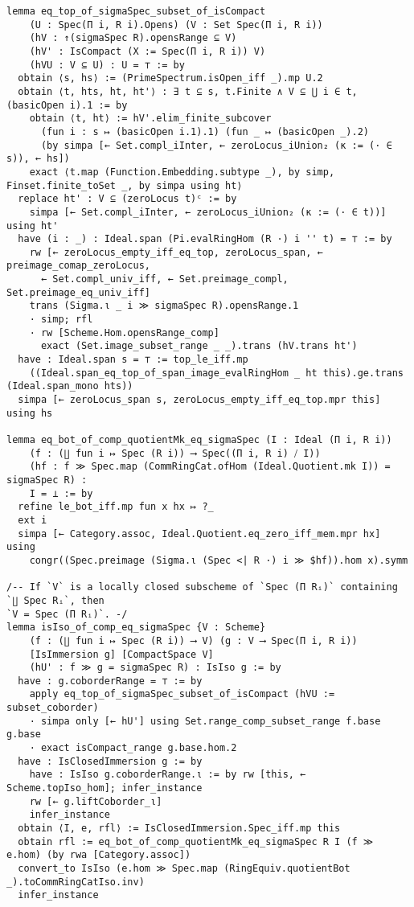 \documentclass{article}
\begin{document}
\begin{lstlisting}[language=Lean, caption={PointsPi.lean}]
lemma eq_top_of_sigmaSpec_subset_of_isCompact
    (U : Spec(Π i, R i).Opens) (V : Set Spec(Π i, R i))
    (hV : ↑(sigmaSpec R).opensRange ⊆ V)
    (hV' : IsCompact (X := Spec(Π i, R i)) V)
    (hVU : V ⊆ U) : U = ⊤ := by
  obtain ⟨s, hs⟩ := (PrimeSpectrum.isOpen_iff _).mp U.2
  obtain ⟨t, hts, ht, ht'⟩ : ∃ t ⊆ s, t.Finite ∧ V ⊆ ⋃ i ∈ t, (basicOpen i).1 := by
    obtain ⟨t, ht⟩ := hV'.elim_finite_subcover
      (fun i : s ↦ (basicOpen i.1).1) (fun _ ↦ (basicOpen _).2)
      (by simpa [← Set.compl_iInter, ← zeroLocus_iUnion₂ (κ := (· ∈ s)), ← hs])
    exact ⟨t.map (Function.Embedding.subtype _), by simp, Finset.finite_toSet _, by simpa using ht⟩
  replace ht' : V ⊆ (zeroLocus t)ᶜ := by
    simpa [← Set.compl_iInter, ← zeroLocus_iUnion₂ (κ := (· ∈ t))] using ht'
  have (i : _) : Ideal.span (Pi.evalRingHom (R ·) i '' t) = ⊤ := by
    rw [← zeroLocus_empty_iff_eq_top, zeroLocus_span, ← preimage_comap_zeroLocus,
      ← Set.compl_univ_iff, ← Set.preimage_compl, Set.preimage_eq_univ_iff]
    trans (Sigma.ι _ i ≫ sigmaSpec R).opensRange.1
    · simp; rfl
    · rw [Scheme.Hom.opensRange_comp]
      exact (Set.image_subset_range _ _).trans (hV.trans ht')
  have : Ideal.span s = ⊤ := top_le_iff.mp
    ((Ideal.span_eq_top_of_span_image_evalRingHom _ ht this).ge.trans (Ideal.span_mono hts))
  simpa [← zeroLocus_span s, zeroLocus_empty_iff_eq_top.mpr this] using hs

lemma eq_bot_of_comp_quotientMk_eq_sigmaSpec (I : Ideal (Π i, R i))
    (f : (∐ fun i ↦ Spec (R i)) ⟶ Spec((Π i, R i) ⧸ I))
    (hf : f ≫ Spec.map (CommRingCat.ofHom (Ideal.Quotient.mk I)) = sigmaSpec R) :
    I = ⊥ := by
  refine le_bot_iff.mp fun x hx ↦ ?_
  ext i
  simpa [← Category.assoc, Ideal.Quotient.eq_zero_iff_mem.mpr hx] using
    congr((Spec.preimage (Sigma.ι (Spec <| R ·) i ≫ $hf)).hom x).symm

/-- If `V` is a locally closed subscheme of `Spec (Π Rᵢ)` containing `∐ Spec Rᵢ`, then
`V = Spec (Π Rᵢ)`. -/
lemma isIso_of_comp_eq_sigmaSpec {V : Scheme}
    (f : (∐ fun i ↦ Spec (R i)) ⟶ V) (g : V ⟶ Spec(Π i, R i))
    [IsImmersion g] [CompactSpace V]
    (hU' : f ≫ g = sigmaSpec R) : IsIso g := by
  have : g.coborderRange = ⊤ := by
    apply eq_top_of_sigmaSpec_subset_of_isCompact (hVU := subset_coborder)
    · simpa only [← hU'] using Set.range_comp_subset_range f.base g.base
    · exact isCompact_range g.base.hom.2
  have : IsClosedImmersion g := by
    have : IsIso g.coborderRange.ι := by rw [this, ← Scheme.topIso_hom]; infer_instance
    rw [← g.liftCoborder_ι]
    infer_instance
  obtain ⟨I, e, rfl⟩ := IsClosedImmersion.Spec_iff.mp this
  obtain rfl := eq_bot_of_comp_quotientMk_eq_sigmaSpec R I (f ≫ e.hom) (by rwa [Category.assoc])
  convert_to IsIso (e.hom ≫ Spec.map (RingEquiv.quotientBot _).toCommRingCatIso.inv)
  infer_instance


\end{lstlisting}
\end{document}
